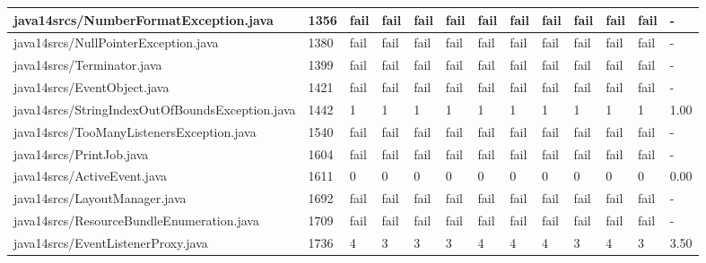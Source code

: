 \begin{tabular}{|l|l|l|l|l|l|l|l|l|l|l|l|l|}
\hline
java14srcs/NumberFormatException.java              & 1356        & fail      & fail      & fail      & fail      & fail      & fail      & fail      & fail      & fail      & fail      & -         \\
\hline
java14srcs/NullPointerException.java               & 1380        & fail      & fail      & fail      & fail      & fail      & fail      & fail      & fail      & fail      & fail      & -         \\
\hline
java14srcs/Terminator.java                         & 1399        & fail      & fail      & fail      & fail      & fail      & fail      & fail      & fail      & fail      & fail      & -         \\
\hline
java14srcs/EventObject.java                        & 1421        & fail      & fail      & fail      & fail      & fail      & fail      & fail      & fail      & fail      & fail      & -         \\
\hline
java14srcs/StringIndexOutOfBoundsException.java    & 1442        & 1         & 1         & 1         & 1         & 1         & 1         & 1         & 1         & 1         & 1         & 1.00      \\
\hline
java14srcs/TooManyListenersException.java          & 1540        & fail      & fail      & fail      & fail      & fail      & fail      & fail      & fail      & fail      & fail      & -         \\
\hline
java14srcs/PrintJob.java                           & 1604        & fail      & fail      & fail      & fail      & fail      & fail      & fail      & fail      & fail      & fail      & -         \\
\hline
java14srcs/ActiveEvent.java                        & 1611        & 0         & 0         & 0         & 0         & 0         & 0         & 0         & 0         & 0         & 0         & 0.00      \\
\hline
java14srcs/LayoutManager.java                      & 1692        & fail      & fail      & fail      & fail      & fail      & fail      & fail      & fail      & fail      & fail      & -         \\
\hline
java14srcs/ResourceBundleEnumeration.java          & 1709        & fail      & fail      & fail      & fail      & fail      & fail      & fail      & fail      & fail      & fail      & -         \\
\hline
java14srcs/EventListenerProxy.java                 & 1736        & 4         & 3         & 3         & 3         & 4         & 4         & 4         & 3         & 4         & 3         & 3.50      \\

\end{tabular}
